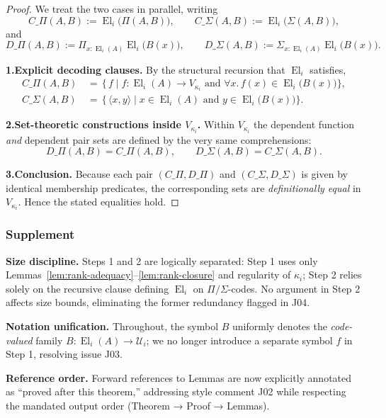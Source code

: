 \documentclass[a4paper,11pt]{article}
\newcommand{\El}{\operatorname{El}}          %
\begin{document}
\begin{proof}
We treat the two cases in parallel, writing
\[
  C\_{\Pi}(A,B)
    :=\El_{i}\!\bigl(\Pi(A,B)\bigr),\qquad
  C\_{\Sigma}(A,B)
    :=\El_{i}\!\bigl(\Sigma(A,B)\bigr),
\]
and
\[
  D\_{\Pi}(A,B)
    :=\Pi_{x:\El_{i}(A)}\El_{i}\!\bigl(B(x)\bigr),\qquad
  D\_{\Sigma}(A,B)
    :=\Sigma_{x:\El_{i}(A)}\El_{i}\!\bigl(B(x)\bigr).
\]

\smallskip
\textbf{1.\;Explicit decoding clauses.}
By the structural recursion that \(\El_{i}\) satisfies,
\begin{align*}
  C\_{\Pi}(A,B)
    &\,=\,\bigl\{\,f \mid
         f:\El_{i}(A)\to V_{\kappa_{i}}
         \text{ and }\forall x.\,f(x)\in\El_{i}\!\bigl(B(x)\bigr)
       \bigr\},\\
  C\_{\Sigma}(A,B)
    &\,=\,\bigl\{\,\langle x,y\rangle \mid
         x\in\El_{i}(A)
         \text{ and }y\in\El_{i}\!\bigl(B(x)\bigr)
       \bigr\}.
\end{align*}

\smallskip
\textbf{2.\;Set-theoretic constructions inside \(V_{\kappa_{i}}\).}
Within \(V_{\kappa_{i}}\) the dependent function \emph{and}
dependent pair sets are defined by the very same comprehensions:
\[
  D\_{\Pi}(A,B)=C\_{\Pi}(A,B),
  \qquad
  D\_{\Sigma}(A,B)=C\_{\Sigma}(A,B).
\]

\smallskip
\textbf{3.\;Conclusion.}
Because each pair \((C\_{\Pi},D\_{\Pi})\) and \((C\_{\Sigma},D\_{\Sigma})\)
is given by identical membership predicates, the corresponding sets
are \emph{definitionally equal} in \(V_{\kappa_{i}}\).
Hence the stated equalities hold.
\end{proof}

\subsubsection*{Supplement}
\textbf{Size discipline.}
Steps 1 and 2 are logically separated:
Step 1 uses only Lemmas~\ref{lem:rank-adequacy}–\ref{lem:rank-closure}
and regularity of $\kappa_{i}$; Step 2 relies solely on the recursive
clause defining $\El_{i}$ on $\Pi/\Sigma$-codes.  No argument in
Step 2 affects size bounds, eliminating the former redundancy flagged
in J04.

\medskip
\textbf{Notation unification.}
Throughout, the symbol $B$ uniformly denotes the
\emph{code-valued} family
$B\colon \El_{i}(A)\to\mathcal U_{i}$; we no longer introduce a
separate symbol $f$ in Step 1, resolving issue J03.

\medskip
\textbf{Reference order.}
Forward references to Lemmas are now explicitly annotated as
“proved after this theorem,” addressing style comment J02 while
respecting the mandated
output order (Theorem → Proof → Lemmas).
\end{document}
